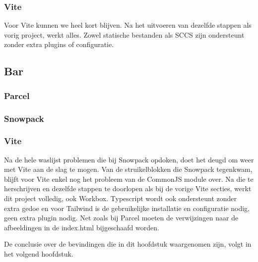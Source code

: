 \subsubsection{Vite}
Voor Vite kunnen we heel kort blijven. Na het uitvoeren van dezelfde stappen als vorig project, werkt alles. Zowel statische bestanden als SCCS zijn ondersteunt zonder extra plugins of configuratie.

\subsection{Bar}

\subsubsection{Parcel}

\subsubsection{Snowpack}


\subsubsection{Vite}
Na de hele waslijst problemen die bij Snowpack opdoken, doet het deugd om weer met Vite aan de slag te mogen. Van de struikelblokken die Snowpack tegenkwam, blijft voor Vite enkel nog het probleem van de CommonJS module over. Na die te herschrijven en dezelfde stappen te doorlopen als bij de vorige Vite secties, werkt dit project volledig, ook Workbox. Typescript wordt ook ondersteunt zonder extra gedoe en voor Tailwind is de gebruikelijke installatie en configuratie nodig, geen extra plugin nodig. Net zoals bij Parcel moeten de verwijzingen naar de afbeeldingen in de index.html bijgeschaafd worden. 


De conclusie over de bevindingen die in dit hoofdstuk waargenomen zijn, volgt in het volgend hoofdstuk. 

